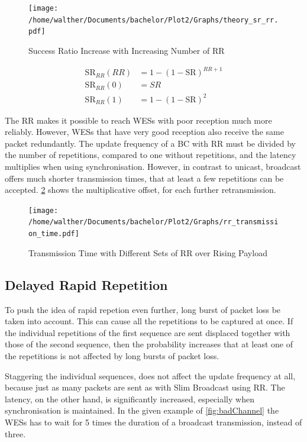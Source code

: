 \begin{figure}[h]
	\centering
	\texttt{[image: /home/walther/Documents/bachelor/Plot2/Graphs/theory\_sr\_rr.pdf]}
	\caption{Success Ratio Increase with Increasing Number of RR}
	\label{fig:theory_rr_sc}
\end{figure}

\begin{align}
	\label{math:rr_sr}
	\text{SR}_{RR}(RR)	&= 1-(1-\text{SR})^{RR+1} \\
	\text{SR}_{RR}(0) 	&= SR \\
	\text{SR}_{RR}(1) 	&= 1-(1-\text{SR})^{2}
\end{align}

The RR makes it possible to reach WESs with poor reception much more reliably.
However, WESs that have very good reception also receive the same packet redundantly.
The update frequency of a BC with RR must be divided by the number of repetitions, 
compared to one without repetitions,
and the latency multiplies when using synchronisation.
However, in contrast to unicast, broadcast offers much shorter transmission times,
that at least a few repetitions can be accepted. 
\cref{fig:rr_analytic} shows the multiplicative offset, for each further retransmission.

\begin{figure}[h]
	\centering
	\texttt{[image: /home/walther/Documents/bachelor/Plot2/Graphs/rr\_transmission\_time.pdf]}
	\caption{Transmission Time with Different Sets of RR over Rising Payload}
	\label{fig:rr_analytic}
\end{figure}

\subsection*{Delayed Rapid Repetition}
\label{sub:DelayedRepetition}

To push the idea of rapid repetion even further, long burst of packet loss be taken into account.
This can cause all the repetitions to be captured at once.
If the individual repetitions of the first sequence 
are sent displaced together with those of the second sequence,
then the probability increases that at least one of the repetitions 
is not affected by long bursts of packet loss.

Staggering the individual sequences, does not affect the update frequency at all,
because just as many packets are sent as with Slim Broadcast using RR.
The latency, on the other hand, is significantly increased, especially when synchronisation is maintained.
In the given example of \cref{fig:badChannel} 
the WESs has to wait for 5 times the duration of a broadcast transmission, instead of three.

